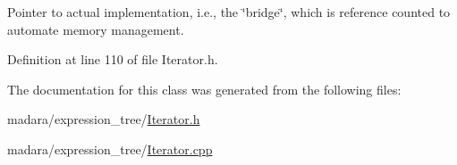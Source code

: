 Pointer to actual implementation, i.e., the \char`\"{}bridge\char`\"{}, which is reference counted to automate memory management. 



Definition at line 110 of file Iterator.h.



The documentation for this class was generated from the following files:\begin{DoxyCompactItemize}
\item 
madara/expression\_\-tree/\hyperlink{Iterator_8h}{Iterator.h}\item 
madara/expression\_\-tree/\hyperlink{Iterator_8cpp}{Iterator.cpp}\end{DoxyCompactItemize}
